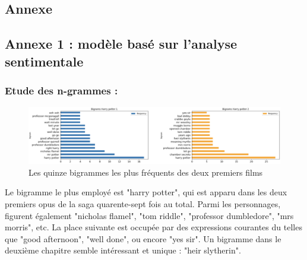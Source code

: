 \documentclass[11pt]{article}
\begin{document}
\begin{center}
\section{Annexe}

\subsection{Annexe 1 : modèle basé sur l'analyse sentimentale}\label{A1}

\subsubsection{Etude des n-grammes :}

\begin{figure}[hbt!]
    \includegraphics[width= 16cm, height= 7 cm]{./figures/bigrams.png}
    \caption{Les quinze bigrammes les plus fréquents des deux premiers films}
    \label{bigrams}
\end{figure}
\FloatBarrier

Le bigramme le plus employé est "harry potter", qui est apparu dans les deux premiers opus de la saga quarente-sept fois au total. Parmi les personnages, figurent également "nicholas flamel", "tom riddle", "professor dumbledore", "mrs morris", etc. La place suivante est occupée par des expressions courantes du telles que "good afternoon", "well done", ou encore "yes sir". Un bigramme dans le deuxième chapitre semble intéressant et unique : "heir slytherin".\par


\end{center}
\end{document}
